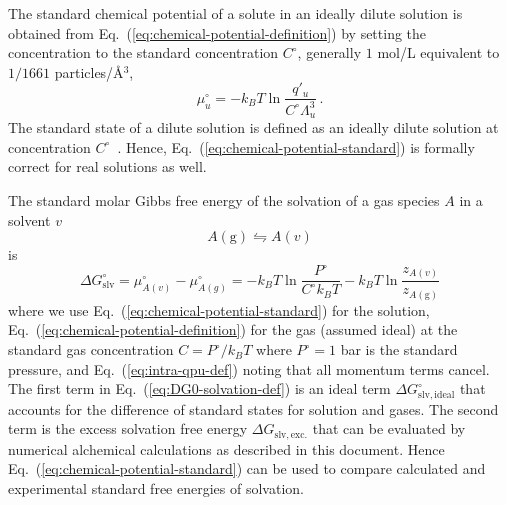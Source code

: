 \documentclass[9pt,bestpractices]{livecoms}
\begin{document}
The standard chemical potential of a solute in an ideally dilute solution is obtained from Eq.~(\ref{eq:chemical-potential-definition}) by setting the concentration to the standard concentration $C^\circ$, generally $1$ mol/L equivalent to $1/1661$ particles/\AA$^{3}$, 
\begin{equation}
  \mu_u^\circ = -k_B T \ln \frac{q'_u}{C^\circ \Lambda_u^3} \, .
  \label{eq:chemical-potential-standard}
\end{equation}
The standard state of a dilute solution is defined as an ideally dilute solution at concentration $C^\circ$~\cite{levine2009physicalchemistrybook6ed}. Hence, Eq.~(\ref{eq:chemical-potential-standard}) is formally correct for real solutions as well.

The standard molar Gibbs free energy of the solvation of a gas species $A$ in a solvent $v$
\begin{equation}
A(\mathrm{g})  \leftrightharpoons A(v)
\end{equation}
is
\begin{equation}
  \Delta G^\circ_{\mathrm{slv}} = \mu^\circ_{A(v)}  - \mu^\circ_{A(g)} = -k_B T \ln \frac{P^\circ}{C^\circ k_B T} - k_B T \ln \frac{z_{A(v)}}{z_{A(\mathrm{g})}}
  \label{eq:DG0-solvation-def}
\end{equation}
where we use Eq.~(\ref{eq:chemical-potential-standard}) for the solution, Eq.~(\ref{eq:chemical-potential-definition}) for the gas (assumed ideal) at the standard gas concentration $C = P^\circ/k_B T$ where $P^\circ = 1$ bar is the standard pressure, and Eq.~(\ref{eq:intra-qpu-def}) noting that all momentum terms cancel. The first term in Eq.~(\ref{eq:DG0-solvation-def}) is an ideal term $\Delta G^\circ_{\mathrm{slv,ideal}}$ that accounts for the difference of standard states for solution and gases. The second term is the excess solvation free energy $\Delta G_{\mathrm{slv, exc.}}$ that can be evaluated by numerical alchemical calculations as described in this document. Hence Eq.~(\ref{eq:chemical-potential-standard}) can be used to compare calculated and experimental standard free energies of solvation\cite{thompson2004new}.
\end{document}

